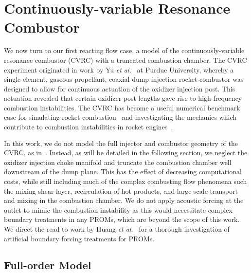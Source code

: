\section{Continuously-variable Resonance Combustor}\label{sec:cvrc}

We now turn to our first reacting flow case, a model of the continuously-variable resonance combustor (CVRC) with a truncated combustion chamber. The CVRC experiment originated in work by Yu \textit{et al.}~\cite{Yu2008,Yu2009,Yu2012} at Purdue University, whereby a single-element, gaseous propellant, coaxial dump injection rocket combustor was designed to allow for continuous actuation of the oxidizer injection post. This actuation revealed that certain oxidizer post lengths gave rise to high-frequency combustion instabilities. The CVRC has become a useful numerical benchmark case for simulating rocket combustion~\cite{Garby2013,Nguyen2018} and investigating the mechanics which contribute to combustion instabilities in rocket engines~\cite{HarvazinskiCVRCOrig,Harvazinski2016,HarvazinskiCVRCflamelet}.

In this work, we do not model the full injector and combustor geometry of the CVRC, as in~\cite{HarvazinskiCVRCOrig}. Instead, as will be detailed in the following section, we neglect the oxidizer injection choke manifold and truncate the combustion chamber well downstream of the dump plane. This has the effect of decreasing computational costs, while still including much of the complex combusting flow phenomena such the mixing shear layer, recirculation of hot products, and large-scale transport and mixing in the combustion chamber. We do not apply acoustic forcing at the outlet to mimic the combustion instability as this would necessitate complex boundary treatments in any PROMs, which are beyond the scope of this work. We direct the read to work by Huang \textit{et al.}~\cite{Huang2022a} for a thorough investigation of artificial boundary forcing treatments for PROMs.

\subsection{Full-order Model}

